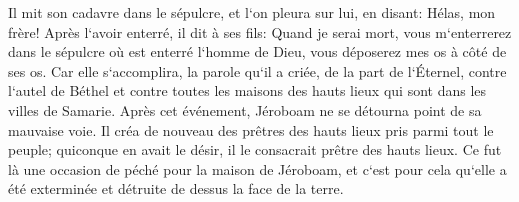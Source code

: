 \verse Il mit son cadavre dans le sépulcre, et l`on pleura sur lui, en disant: Hélas, mon frère! 
\verse Après l`avoir enterré, il dit à ses fils: Quand je serai mort, vous m`enterrerez dans le sépulcre où est enterré l`homme de Dieu, vous déposerez mes os à côté de ses os. 
\verse Car elle s`accomplira, la parole qu`il a criée, de la part de l`Éternel, contre l`autel de Béthel et contre toutes les maisons des hauts lieux qui sont dans les villes de Samarie. 
\verse Après cet événement, Jéroboam ne se détourna point de sa mauvaise voie. Il créa de nouveau des prêtres des hauts lieux pris parmi tout le peuple; quiconque en avait le désir, il le consacrait prêtre des hauts lieux. 
\verse Ce fut là une occasion de péché pour la maison de Jéroboam, et c`est pour cela qu`elle a été exterminée et détruite de dessus la face de la terre. 

\chapter{}


